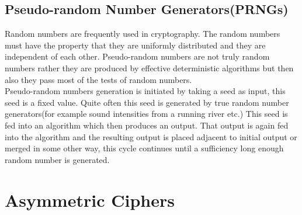 \documentclass{article}
\begin{document}
\subsection{Pseudo-random Number Generators(PRNGs)}
Random numbers are frequently used in cryptography. The random numbers must have the property that they are uniformly distributed and they are independent of each other.
Pseudo-random numbers are not truly random numbers rather they are produced by effective  deterministic algorithms but then also they pass most of the tests of random numbers.\\
Pseudo-random numbers generation is initiated by taking a seed as input, this seed is a fixed value. Quite often this seed is generated by true random number generators(for example sound intensities from a running river etc.)
This seed is fed into an algorithm which then produces an output. That output is again fed into the algorithm and the resulting output is placed adjacent to initial output or merged in some other way, this cycle continues until a sufficiency long enough random number is generated.

\section{Asymmetric Ciphers}
\end{document}
